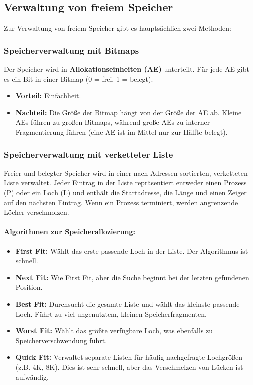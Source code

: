 \subsection{Verwaltung von freiem Speicher}
Zur Verwaltung von freiem Speicher gibt es hauptsächlich zwei Methoden:

\subsubsection{Speicherverwaltung mit Bitmaps}
Der Speicher wird in \textbf{Allokationseinheiten (AE)} unterteilt. Für jede AE
gibt es ein Bit in einer Bitmap (0 = frei, 1 = belegt).
\begin{itemize}
    \item \textbf{Vorteil:} Einfachheit.
    \item \textbf{Nachteil:} Die Größe der Bitmap hängt von der Größe der AE ab. Kleine AEs führen zu großen Bitmaps, während große AEs zu interner Fragmentierung führen (eine AE ist im Mittel nur zur Hälfte belegt).
\end{itemize}

\subsubsection{Speicherverwaltung mit verketteter Liste}
Freier und belegter Speicher wird in einer nach Adressen sortierten,
verketteten Liste verwaltet. Jeder Eintrag in der Liste repräsentiert entweder
einen Prozess (P) oder ein Loch (L) und enthält die Startadresse, die Länge und
einen Zeiger auf den nächsten Eintrag. Wenn ein Prozess terminiert, werden
angrenzende Löcher verschmolzen.

\paragraph{Algorithmen zur Speicherallozierung:}
\begin{itemize}
    \item \textbf{First Fit:} Wählt das erste passende Loch in der Liste. Der Algorithmus ist schnell.
    \item \textbf{Next Fit:} Wie First Fit, aber die Suche beginnt bei der letzten gefundenen Position.
    \item \textbf{Best Fit:} Durchsucht die gesamte Liste und wählt das kleinste passende Loch. Führt zu viel ungenutztem, kleinen Speicherfragmenten.
    \item \textbf{Worst Fit:} Wählt das größte verfügbare Loch, was ebenfalls zu Speicherverschwendung führt.
    \item \textbf{Quick Fit:} Verwaltet separate Listen für häufig nachgefragte Lochgrößen (z.B. 4K, 8K). Dies ist sehr schnell, aber das Verschmelzen von Lücken ist aufwändig.
\end{itemize}

